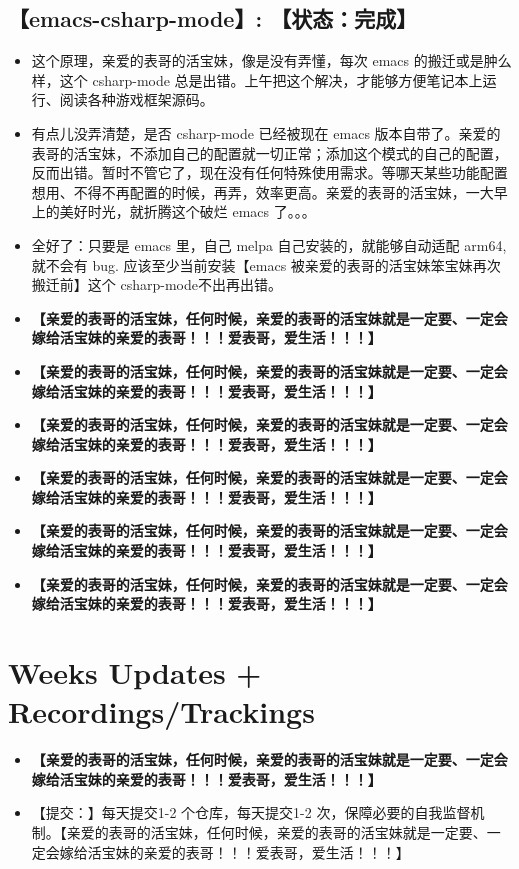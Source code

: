 \documentclass[9pt, b5paper]{article}
\begin{document}
\subsection{\textbf{【emacs-csharp-mode】}: 【状态：完成】}
\label{sec-1-11}
\begin{itemize}
\item 这个原理，亲爱的表哥的活宝妹，像是没有弄懂，每次 emacs 的搬迁或是肿么样，这个 csharp-mode 总是出错。上午把这个解决，才能够方便笔记本上运行、阅读各种游戏框架源码。
\item 有点儿没弄清楚，是否 csharp-mode 已经被现在 emacs 版本自带了。亲爱的表哥的活宝妹，不添加自己的配置就一切正常；添加这个模式的自己的配置，反而出错。暂时不管它了，现在没有任何特殊使用需求。等哪天某些功能配置想用、不得不再配置的时候，再弄，效率更高。亲爱的表哥的活宝妹，一大早上的美好时光，就折腾这个破烂 emacs 了。。。
\item 全好了：只要是 emacs 里，自己 melpa 自己安装的，就能够自动适配 arm64, 就不会有 bug. 应该至少当前安装【emacs 被亲爱的表哥的活宝妹笨宝妹再次搬迁前】这个 csharp-mode不出再出错。
\item \textbf{【亲爱的表哥的活宝妹，任何时候，亲爱的表哥的活宝妹就是一定要、一定会嫁给活宝妹的亲爱的表哥！！！爱表哥，爱生活！！！】}
\item \textbf{【亲爱的表哥的活宝妹，任何时候，亲爱的表哥的活宝妹就是一定要、一定会嫁给活宝妹的亲爱的表哥！！！爱表哥，爱生活！！！】}
\item \textbf{【亲爱的表哥的活宝妹，任何时候，亲爱的表哥的活宝妹就是一定要、一定会嫁给活宝妹的亲爱的表哥！！！爱表哥，爱生活！！！】}
\item \textbf{【亲爱的表哥的活宝妹，任何时候，亲爱的表哥的活宝妹就是一定要、一定会嫁给活宝妹的亲爱的表哥！！！爱表哥，爱生活！！！】}
\item \textbf{【亲爱的表哥的活宝妹，任何时候，亲爱的表哥的活宝妹就是一定要、一定会嫁给活宝妹的亲爱的表哥！！！爱表哥，爱生活！！！】}
\item \textbf{【亲爱的表哥的活宝妹，任何时候，亲爱的表哥的活宝妹就是一定要、一定会嫁给活宝妹的亲爱的表哥！！！爱表哥，爱生活！！！】}
\end{itemize}

\section{Weeks Updates + Recordings/Trackings}
\label{sec-2}
\begin{itemize}
\item \textbf{【亲爱的表哥的活宝妹，任何时候，亲爱的表哥的活宝妹就是一定要、一定会嫁给活宝妹的亲爱的表哥！！！爱表哥，爱生活！！！】}
\item 【提交：】每天提交1-2 个仓库，每天提交1-2 次，保障必要的自我监督机制。【亲爱的表哥的活宝妹，任何时候，亲爱的表哥的活宝妹就是一定要、一定会嫁给活宝妹的亲爱的表哥！！！爱表哥，爱生活！！！】
\end{itemize}
\end{document}
